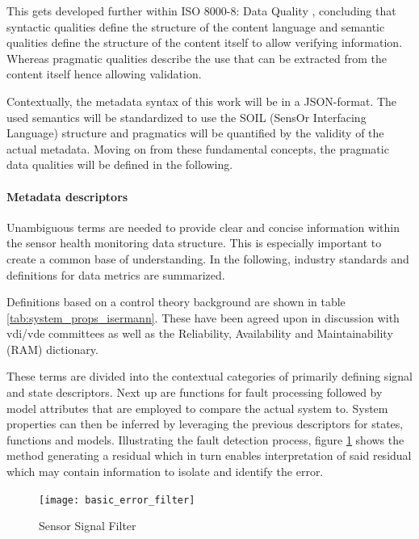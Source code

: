 This gets developed further within ISO 8000-8: Data Quality \cite{iso_data-quality_information_2015}, concluding that syntactic qualities define the structure of the content language and semantic qualities define the structure of the content itself to allow verifying information. Whereas pragmatic qualities describe the use that can be extracted from the content itself hence allowing validation.

Contextually, the metadata syntax of this work will be in a JSON-format. The used semantics will be standardized to use the SOIL (SensOr Interfacing Language) structure and pragmatics will be quantified by the validity of the actual metadata. Moving on from these fundamental concepts, the pragmatic data qualities will be defined in the following.

\paragraph{Metadata descriptors}

Unambiguous terms are needed to provide clear and concise information within the sensor health monitoring data structure. This is especially important to create a common base of understanding. In the following, industry standards and definitions for data metrics are summarized.

Definitions based on a control theory background are shown in table \ref{tab:system_props_isermann}. These have been agreed upon in discussion with vdi/vde committees as well as the Reliability, Availability and Maintainability (RAM) dictionary. \cite{isermann_trends_nodate,din_din25424_fehlerbaumanalysepdf_1977}

These terms are divided into the contextual categories of primarily defining signal and state descriptors. Next up are functions for fault processing followed by model attributes that are employed to compare the actual system to. System properties can then be inferred by leveraging the previous descriptors for states, functions and models. Illustrating the fault detection process, figure \ref{fig:basic_error_filter} shows the method generating a residual which in turn enables interpretation of said residual which may contain information to isolate and identify the error.


\begin{figure}[ht]
    \centering
    \texttt{[image: basic\_error\_filter]}
    \caption{Sensor Signal Filter}
    \label{fig:basic_error_filter}
\end{figure}





